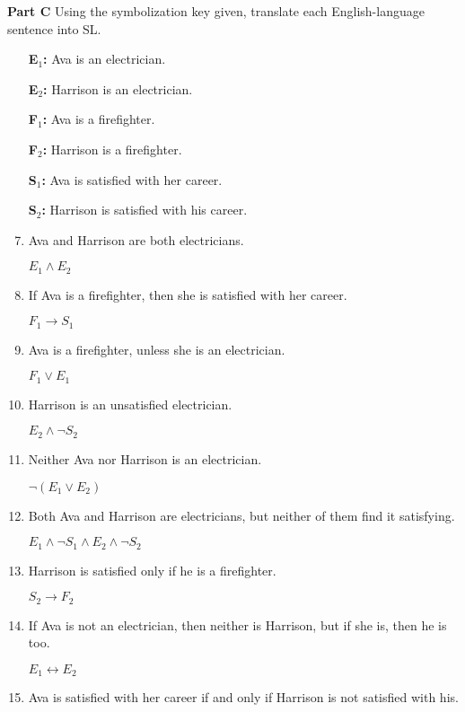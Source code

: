 \documentclass[12pt, letterpaper, twoside]{article}
\begin{document}
\noindent \textbf{Part C} Using the symbolization key given,
translate each English-language sentence into SL.
\begin{enumerate}
	\item[\textbf{E$_1$:}] Ava is an electrician.
	\item[\textbf{E$_2$:}] Harrison is an electrician.
	\item[\textbf{F$_1$:}] Ava is a firefighter.
	\item[\textbf{F$_2$:}] Harrison is a firefighter.
	\item[\textbf{S$_1$:}] Ava is satisfied with her
          career.
	\item[\textbf{S$_2$:}] Harrison is satisfied with
          his career.
	
	\item Ava and Harrison are both electricians.

	$E_1 \wedge E_2$

	\item If Ava is a firefighter, then she is satisfied
          with her career.

	$F_1 \rightarrow S_1$

	\item Ava is a firefighter, unless she is an
          electrician.

	$F_1 \vee E_1$

	\item Harrison is an unsatisfied electrician.

	$E_2 \wedge \neg S_2$

	\item Neither Ava nor Harrison is an electrician.

	$\neg (E_1 \vee E_2)$

	\item Both Ava and Harrison are electricians, but
          neither of them find it satisfying.

	$E_1 \wedge \neg S_1 \wedge E_2 \wedge \neg S_2$

	\item Harrison is satisfied only if he is a
          firefighter.

	$S_2 \rightarrow F_2$

	\item If Ava is not an electrician, then neither is
          Harrison, but if she is, then he is too.

	$E_1 \leftrightarrow E_2$

	\item Ava is satisfied with her career if and only
          if Harrison is not satisfied with his.


\end{enumerate}
\end{document}
